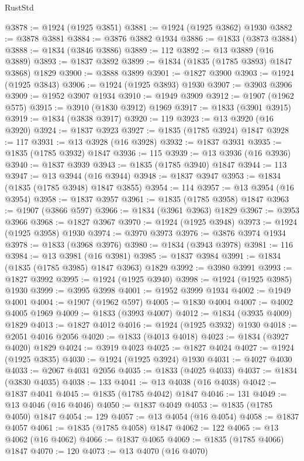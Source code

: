 \begin{lexlean}{RustStd}
\begin{coremodule}
{\begin{coremodule}
{{{{{@3878 := @1924 (@1925 @3851)
@3881 := @1924 (@1925 @3862) @1930
@3882 := @3878 @3881
@3884 := @3876 @3882 @1934
@3886 := @1833 (@3873 @3884)
@3888 := @1834 (@3846 @3886)
@3889 := 112
@3892 := @13 @3889 (@16 @3889)
@3893 := @1837 @3892
@3899 := @1834 (@1835 (@1785 @3893) @1847 @3868) @1829
@3900 := @3888 @3899
@3901 := @1827 @3900
@3903 := @1924 (@1925 @3843)
@3906 := @1924 (@1925 @3893) @1930
@3907 := @3903 @3906
@3909 := @1952 @3907 @1934
@3910 := @1949 @3909
@3912 := @1907 (@1962 @575)
@3915 := @3910 (@1830 @3912) @1969
@3917 := @1833 (@3901 @3915)
@3919 := @1834 (@3838 @3917)
@3920 := 119
@3923 := @13 @3920 (@16 @3920)
@3924 := @1837 @3923
@3927 := @1835 (@1785 @3924) @1847
@3928 := 117
@3931 := @13 @3928 (@16 @3928)
@3932 := @1837 @3931
@3935 := @1835 (@1785 @3932) @1847
@3936 := 115
@3939 := @13 @3936 (@16 @3936)
@3940 := @1837 @3939
@3943 := @1835 (@1785 @3940) @1847
@3944 := 113
@3947 := @13 @3944 (@16 @3944)
@3948 := @1837 @3947
@3953 := @1834 (@1835 (@1785 @3948) @1847 @3855)
@3954 := 114
@3957 := @13 @3954 (@16 @3954)
@3958 := @1837 @3957
@3961 := @1835 (@1785 @3958) @1847
@3963 := @1907 (@3866 @597)
@3966 := @1834 (@3961 @3963) @1829
@3967 := @3953 @3966
@3968 := @1827 @3967
@3970 := @1924 (@1925 @3948)
@3973 := @1924 (@1925 @3958) @1930
@3974 := @3970 @3973
@3976 := @3876 @3974 @1934
@3978 := @1833 (@3968 @3976)
@3980 := @1834 (@3943 @3978)
@3981 := 116
@3984 := @13 @3981 (@16 @3981)
@3985 := @1837 @3984
@3991 := @1834 (@1835 (@1785 @3985) @1847 @3963) @1829
@3992 := @3980 @3991
@3993 := @1827 @3992
@3995 := @1924 (@1925 @3940)
@3998 := @1924 (@1925 @3985) @1930
@3999 := @3995 @3998
@4001 := @1952 @3999 @1934
@4002 := @1949 @4001
@4004 := @1907 (@1962 @597)
@4005 := @1830 @4004
@4007 := @4002 @4005 @1969
@4009 := @1833 (@3993 @4007)
@4012 := @1834 (@3935 @4009) @1829
@4013 := @1827 @4012
@4016 := @1924 (@1925 @3932) @1930
@4018 := @2051 @4016 @2056
@4020 := @1833 (@4013 @4018)
@4023 := @1834 (@3927 @4020) @1829
@4024 := @3919 @4023
@4025 := @1827 @4024
@4027 := @1924 (@1925 @3835)
@4030 := @1924 (@1925 @3924) @1930
@4031 := @4027 @4030
@4033 := @2067 @4031 @2056
@4035 := @1833 (@4025 @4033)
@4037 := @1834 (@3830 @4035)
@4038 := 133
@4041 := @13 @4038 (@16 @4038)
@4042 := @1837 @4041
@4045 := @1835 (@1785 @4042) @1847
@4046 := 131
@4049 := @13 @4046 (@16 @4046)
@4050 := @1837 @4049
@4053 := @1835 (@1785 @4050) @1847
@4054 := 129
@4057 := @13 @4054 (@16 @4054)
@4058 := @1837 @4057
@4061 := @1835 (@1785 @4058) @1847
@4062 := 122
@4065 := @13 @4062 (@16 @4062)
@4066 := @1837 @4065
@4069 := @1835 (@1785 @4066) @1847
@4070 := 120
@4073 := @13 @4070 (@16 @4070)
}}}}}
\end{coremodule}}
\end{coremodule}
\end{lexlean}
